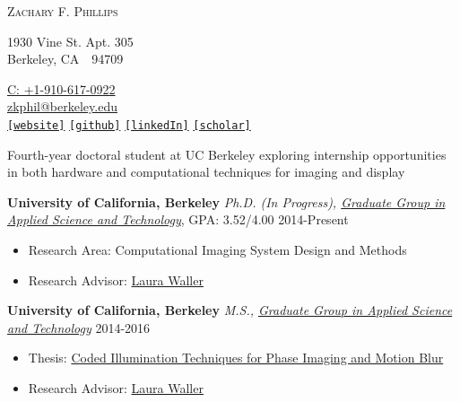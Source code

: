 \documentclass[12pt,letterpaper]{article}
\makeatletter
\def\myemail{zkphil@berkeley.edu}
\def\myweb{https://www.ocf.berkeley.edu/~zfphil/}
\def\mygithub{https://github.com/zfphil}
\def\myphone{+1-910-617-0922}
\newcommand{\mhead}[1]{\leavevmode\marginpar{\sffamily\footnotesize #1}}
\newcommand{\rdate}[1]{{} \hfill #1}
\def\hrulefill{\leavevmode\leaders \hrule height \rulethickness \hfill\kern\z@}
\makeatother
\begin{document}
\flushbottom
\pagestyle{fancy} \setlength\headwidth{6.5in}
 \cfoot{}
\thispagestyle{empty}
\begin{adjustwidth}{-1in}{}
{\Huge
  {\textsc{%
Zachary F.
Phillips}
  }
}
\hfill\hfill\hfill
{
  \begin{minipage}[b]{2in}
    \flushleft \footnotesize
    1930 Vine St. Apt. 305 \\
    Berkeley, CA~~94709
  \end{minipage}
  \hfill
  \begin{minipage}[b]{2in}
    \flushright \footnotesize
    \href{tel:\myphone}{C: \myphone} \\ %
    \href{mailto:\myemail}{\myemail} \\
    \href{\myweb}{\texttt{[website]}}
    \href{\mygithub}{\texttt{[github]}}
    \href{https://www.linkedin.com/pub/zack-phillips/49/889/b28}{\texttt{[linkedIn]}}
    \href{https://scholar.google.com/citations?user=yRsMPdkAAAAJ&hl=en&authuser=1}{\texttt{[scholar]}}
  \end{minipage}
}\par
\end{adjustwidth}
\reversemarginpar
\setlength\marginparwidth{0.85in}
\smallskip
\mhead{Summary}Fourth-year doctoral student at UC Berkeley exploring internship opportunities in both hardware and computational techniques for imaging and display

\medskip
\mhead{Education}%
\textbf{University of California, Berkeley} \newline
\emph{Ph.D. (In Progress), \href{http://ast.coe.berkeley.edu/}{Graduate Group in Applied Science and Technology}}, GPA: 3.52/4.00  \rdate{2014-Present}
\begin{itemize}
  \item Research Area: Computational Imaging System Design and Methods
  \item Research Advisor: \href{http://www.laurawaller.com}{Laura Waller}
\end{itemize}

\textbf{University of California, Berkeley} \newline
\emph{M.S., \href{http://ast.coe.berkeley.edu/}{Graduate Group in Applied Science and Technology}} \rdate{2014-2016}
\begin{itemize}
  \item Thesis: \href{https://www.dropbox.com/s/emnxog3kvvpphvy/Phillips_mastersThesis_submitted.pdf?dl=0}{Coded Illumination Techniques for Phase Imaging and Motion Blur}
  \item Research Advisor: \href{http://www.laurawaller.com}{Laura Waller}

\end{itemize}
\end{document}
